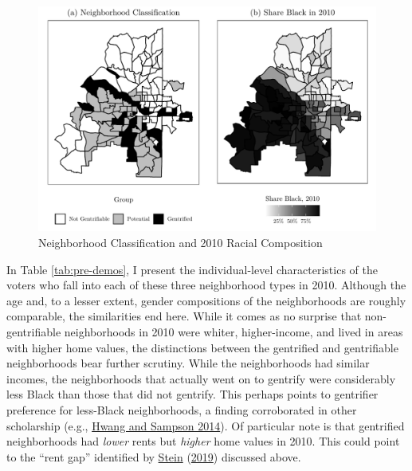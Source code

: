 \documentclass[
  12pt,
]{article}
\begin{document}
\begin{figure}[H]

{\centering \includegraphics{gentrification_files/figure-latex/maps-1} 

}

\caption{\label{fig:maps}Neighborhood Classification and 2010 Racial Composition}\label{fig:maps}
\end{figure}

In Table \ref{tab:pre-demos}, I present the individual-level characteristics of the voters who fall into each of these three neighborhood types in 2010. Although the age and, to a lesser extent, gender compositions of the neighborhoods are roughly comparable, the similarities end here. While it comes as no surprise that non-gentrifiable neighborhoods in 2010 were whiter, higher-income, and lived in areas with higher home values, the distinctions between the gentrified and gentrifiable neighborhoods bear further scrutiny. While the neighborhoods had similar incomes, the neighborhoods that actually went on to gentrify were considerably less Black than those that did not gentrify. This perhaps points to gentrifier preference for less-Black neighborhoods, a finding corroborated in other scholarship (e.g., \protect\hyperlink{ref-Hwang2014}{Hwang and Sampson 2014}). Of particular note is that gentrified neighborhoods had \emph{lower} rents but \emph{higher} home values in 2010. This could point to the ``rent gap'' identified by \protect\hyperlink{ref-Stein2019}{Stein} (\protect\hyperlink{ref-Stein2019}{2019}) discussed above.
\end{document}

